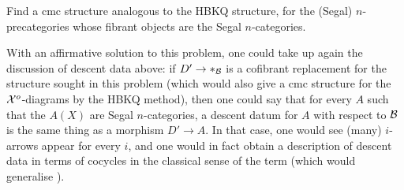 \begin{problem}
Find a cmc structure analogous to the HBKQ structure, for the (Segal)
$n$-precategories whose fibrant objects are the Segal $n$-categories.
\end{problem}

With an affirmative solution to this problem, one could take up again the
discussion of descent data above: if $D'\rightarrow \ast _{{\cal B}}$ is a cofibrant
replacement for the structure sought in this problem (which would also give a
cmc structure for the ${\cal X}^o$-diagrams by the HBKQ method), then one could say
that for every $A$ such that the $A(X)$ are Segal $n$-categories, a descent
datum for $A$ with respect to ${\cal B}$ is the same thing as a morphism
$D'\rightarrow A$. In that case, one would see (many) $i$-arrows appear for
every $i$, and one would in fact obtain a description of descent data in terms
of cocycles in the classical sense of the term (which would generalise
\cite{Breen}).
